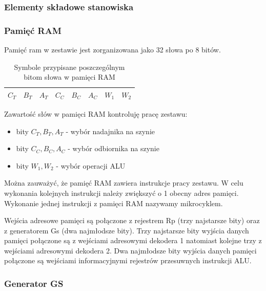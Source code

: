 \documentclass[../main.tex]{subfiles}
\begin{document}
    \subsubsection{Elementy składowe stanowiska}

        \subsubsection*{Pamięć RAM}

        Pamięć ram w zestawie jest zorganizowana jako 32 słowa po 8 bitów.
        \begin{table}[ht]
            \centering
            \begin{tabular}{|ccc|ccc|cc|}
                \hline
                $C_T$ & $B_T$ & $A_T$ & $C_C$ & $B_C$ & $A_C$ & $W_1$ & $W_2$ \\ \hline
            \end{tabular}
            \caption{Symbole przypisane  poszczególnym bitom słowa w pamięci RAM}
            \label{tab:ram_symbol}
        \end{table}
        
        Zawartość słów w pamięci RAM kontroluję pracę zestawu:

        \begin{itemize}
            \item bity $C_T, B_T, A_T$ - wybór nadajnika na szynie
            \item bity $C_C, B_C, A_C$ - wybór odbiornika na szynie
            \item bity $W_1, W_2$ - wybór operacji ALU
        \end{itemize}

        Można zauważyć, że pamięć RAM zawiera instrukcje pracy zestawu. W celu wykonania kolejnych instrukcji należy zwiększyć o 1
        obecny adres pamięci. Wykonanie jednej instrukcji z pamięci RAM nazywamy mikrocyklem.
        \par
        Wejścia adresowe pamięci są połączone z rejestrem Rp (trzy najstarsze bity) oraz z generatorem Gs (dwa najmłodsze bity). 
        Trzy najstarsze bity wyjścia danych pamięci połączone są z wejściami adresowymi dekodera 1 natomiast kolejne trzy z wejściami 
        adresowymi dekodera 2. Dwa najmłodsze bity wyjścia danych pamięci połączone są wejściami informacyjnymi rejestrów przesuwnych instrukcji ALU.

        \subsubsection*{Generator GS}
        
\end{document}
